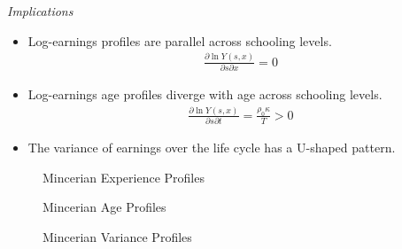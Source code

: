 \begin{frame}\begin{center}
\LARGE\textit{Implications}
\end{center}\end{frame}



\begin{frame}
\begin{itemize}
\item Log-earnings profiles are parallel across schooling levels.
\begin{align*}
\frac{\partial \ln{Y(s, x)}}{\partial s \partial x} = 0
\end{align*}
\item Log-earnings age profiles diverge with age across schooling levels.
\begin{align*}
\frac{\partial \ln{Y(s, x)}}{\partial s \partial t} = \frac{\rho_0\kappa}{T} > 0
\end{align*}
\item The variance of earnings over the life cycle has a U-shaped pattern.
\end{itemize}
\end{frame}


\begin{frame}
\begin{figure}[htp]\centering
\caption{Mincerian Experience Profiles}\label{Mincerian Experience Profiles}
\end{figure}
\end{frame}

\begin{frame}
\begin{figure}[htp]\centering
\caption{Mincerian Age Profiles}\label{Mincerian Age Profiles}
\end{figure}
\end{frame}


\begin{frame}
\begin{figure}[htp]\centering
\caption{Mincerian Variance Profiles}\label{Mincerian Variance Profiles}
\end{figure}
\end{frame}

